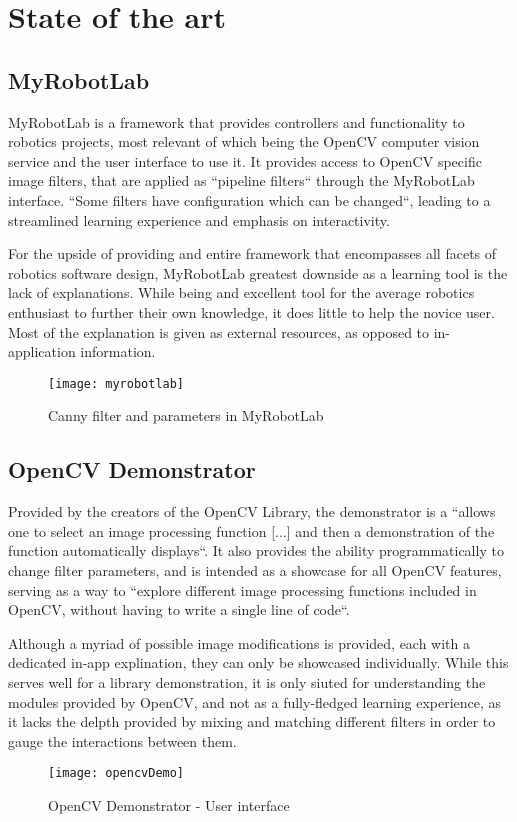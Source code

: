 \section{State of the art}

\subsection{MyRobotLab}

MyRobotLab is a framework that provides controllers and functionality to robotics projects, most
relevant of which being the OpenCV computer vision service and the user interface to use it.
It provides access to OpenCV specific image filters, that are applied as ``pipeline filters`` through
the MyRobotLab interface. ``Some filters have configuration which can be changed``, leading to a
streamlined learning experience and emphasis on interactivity. \cite{myRobotLab}

For the upside of providing and entire framework that encompasses all facets of robotics software
design, MyRobotLab greatest downside as a learning tool is the lack of explanations. While being
and excellent tool for the average robotics enthusiast to further their own knowledge, it does little
to help the novice user. Most of the explanation is given as external resources, as opposed to
in-application information.

\begin{figure}[H]
	\texttt{[image: myrobotlab]}
	\caption{Canny filter and parameters in MyRobotLab \cite{myRobotLab}}
\end{figure}


\subsection{OpenCV Demonstrator}

Provided by the creators of the OpenCV Library, the demonstrator is a ``allows one to select an image
processing function [...] and then a demonstration of the function automatically displays``.
It also provides the ability programmatically to change filter parameters, and is intended as a showcase
for all OpenCV features, serving as a way to ``explore different image processing functions included in 
OpenCV, without having to write a single line of code``. \cite{opencvDemo}

Although a myriad of possible image modifications is provided, each with a dedicated in-app explination,
they can only be showcased individually.
While this serves well for a library demonstration, it is only siuted for understanding the modules
provided by OpenCV, and not as a fully-fledged learning experience, as it lacks the delpth provided
by mixing and matching different filters in order to gauge the interactions between them.

\begin{figure}[H]
	\texttt{[image: opencvDemo]}
	\caption{OpenCV Demonstrator - User interface \cite{opencvDemo}}
\end{figure}

